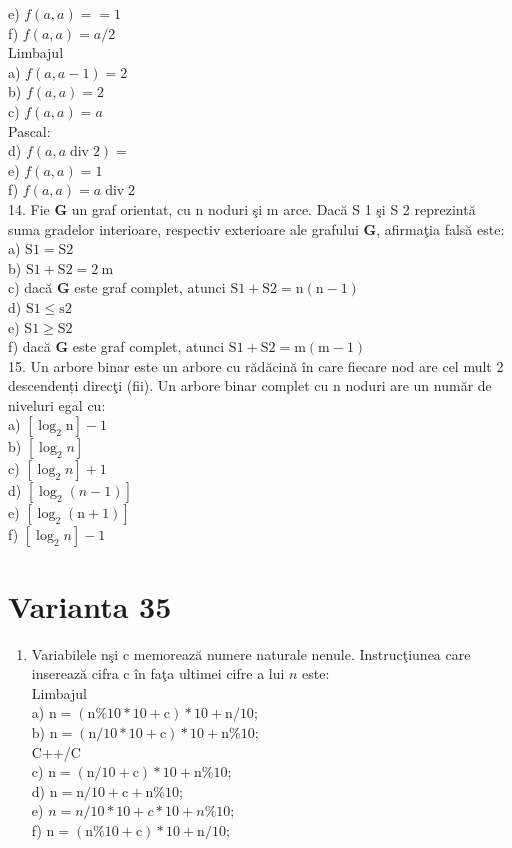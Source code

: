 \documentclass[10pt]{article}
\begin{document}
e) $f(a, a)==1$\\
f) $f(a, a)=a / 2$\\
Limbajul\\
a) $f(a, a-1)=2$\\
b) $f(a, a)=2$\\
c) $f(a, a)=a$\\
Pascal:\\
d) $f(a, a \operatorname{div} 2)=$\\
e) $f(a, a)=1$\\
f) $f(a, a)=a \operatorname{div} 2$\\
14. Fie $\mathbf{G}$ un graf orientat, cu n noduri şi m arce. Dacă S 1 şi S 2 reprezintă suma gradelor interioare, respectiv exterioare ale grafului $\mathbf{G}$, afirmaţia falsă este:\\
a) $\mathrm{S} 1=\mathrm{S} 2$\\
b) $\mathrm{S} 1+\mathrm{S} 2=2 \mathrm{~m}$\\
c) dacă $\mathbf{G}$ este graf complet, atunci $\mathrm{S} 1+\mathrm{S} 2=\mathrm{n}(\mathrm{n}-1)$\\
d) $\mathrm{S} 1 \leq \mathrm{s} 2$\\
e) $\mathrm{S} 1 \geq \mathrm{S} 2$\\
f) dacă $\mathbf{G}$ este graf complet, atunci $\mathrm{S} 1+\mathrm{S} 2=\mathrm{m}(\mathrm{m}-1)$\\
15. Un arbore binar este un arbore cu rădăcină în care fiecare nod are cel mult 2 descendenți direcţi (fii). Un arbore binar complet cu n noduri are un număr de niveluri egal cu:\\
a) $\left[\log _{2} \mathrm{n}\right]-1$\\
b) $\left[\log _{2} n\right]$\\
c) $\left[\log _{2} n\right]+1$\\
d) $\left[\log _{2}(n-1)\right]$\\
e) $\left[\log _{2}(\mathrm{n}+1)\right]$\\
f) $\left[\log _{2} n\right]-1$

\section*{Varianta 35}
\begin{enumerate}
  \item Variabilele nşi c memorează numere naturale nenule. Instrucţiunea care inserează cifra c în faţa ultimei cifre a lui $n$ este:\\
Limbajul\\
a) $\mathrm{n}=(\mathrm{n} \% 10 * 10+\mathrm{c}) * 10+\mathrm{n} / 10$;\\
b) $\mathrm{n}=(\mathrm{n} / 10 * 10+\mathrm{c}) * 10+\mathrm{n} \% 10$;\\
C++/C\\
c) $\mathrm{n}=(\mathrm{n} / 10+\mathrm{c}) * 10+\mathrm{n} \% 10$;\\
d) $\mathrm{n}=\mathrm{n} / 10+\mathrm{c}+\mathrm{n} \% 10$;\\
e) $n=n / 10 * 10+c * 10+n \% 10$;\\
f) $\mathrm{n}=(\mathrm{n} \% 10+\mathrm{c}) * 10+\mathrm{n} / 10$;
\end{enumerate}
\end{document}
